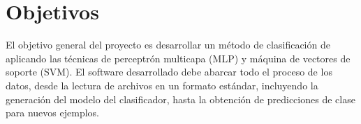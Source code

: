 %
%
%
\section{Objetivos}
%
El objetivo general del proyecto es desarrollar un método de
clasificación de  aplicando las técnicas de
perceptrón multicapa (MLP) y máquina de vectores de soporte (SVM).
El software desarrollado debe abarcar todo el proceso de los datos,
desde la lectura de archivos en un formato estándar, incluyendo la
generación del modelo del clasificador, hasta la obtención de 
predicciones de clase para nuevos ejemplos.

